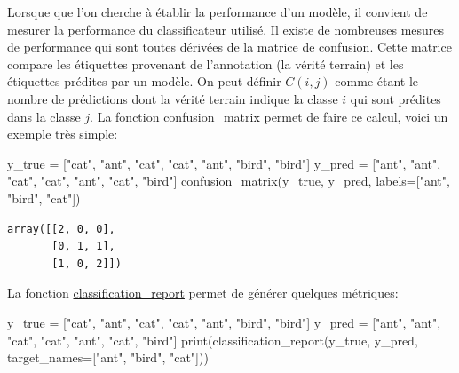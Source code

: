 \documentclass[
  french,
  11pt,
  letterpaper,
  open=any,
  twoside=false,
  french]{scrbook}
\newenvironment{Shaded}{\begin{snugshade}}{\end{snugshade}}
\newcommand{\BuiltInTok}[1]{\textcolor[rgb]{0.00,0.23,0.31}{#1}}
\newcommand{\NormalTok}[1]{\textcolor[rgb]{0.00,0.23,0.31}{#1}}
\newcommand{\OperatorTok}[1]{\textcolor[rgb]{0.37,0.37,0.37}{#1}}
\newcommand{\StringTok}[1]{\textcolor[rgb]{0.13,0.47,0.30}{#1}}
\begin{document}
Lorsque que l'on cherche à établir la performance d'un modèle, il
convient de mesurer la performance du classificateur utilisé. Il existe
de nombreuses mesures de performance qui sont toutes dérivées de la
matrice de confusion. Cette matrice compare les étiquettes provenant de
l'annotation (la vérité terrain) et les étiquettes prédites par un
modèle. On peut définir \(C(i,j)\) comme étant le nombre de prédictions
dont la vérité terrain indique la classe \(i\) qui sont prédites dans la
classe \(j\). La fonction
\href{https://scikit-learn.org/stable/modules/generated/sklearn.metrics.confusion_matrix.html}{confusion\_matrix}
permet de faire ce calcul, voici un exemple très simple:

\begin{Shaded}
\begin{Highlighting}[]
\NormalTok{y\_true }\OperatorTok{=}\NormalTok{ [}\StringTok{"cat"}\NormalTok{, }\StringTok{"ant"}\NormalTok{, }\StringTok{"cat"}\NormalTok{, }\StringTok{"cat"}\NormalTok{, }\StringTok{"ant"}\NormalTok{, }\StringTok{"bird"}\NormalTok{, }\StringTok{"bird"}\NormalTok{]}
\NormalTok{y\_pred }\OperatorTok{=}\NormalTok{ [}\StringTok{"ant"}\NormalTok{, }\StringTok{"ant"}\NormalTok{, }\StringTok{"cat"}\NormalTok{, }\StringTok{"cat"}\NormalTok{, }\StringTok{"ant"}\NormalTok{, }\StringTok{"cat"}\NormalTok{, }\StringTok{"bird"}\NormalTok{]}
\NormalTok{confusion\_matrix(y\_true, y\_pred, labels}\OperatorTok{=}\NormalTok{[}\StringTok{"ant"}\NormalTok{, }\StringTok{"bird"}\NormalTok{, }\StringTok{"cat"}\NormalTok{])}
\end{Highlighting}
\end{Shaded}

\begin{verbatim}
array([[2, 0, 0],
       [0, 1, 1],
       [1, 0, 2]])
\end{verbatim}

La fonction
\href{https://scikit-learn.org/stable/modules/generated/sklearn.metrics.classification_report.html\#sklearn.metrics.classification_report}{classification\_report}
permet de générer quelques métriques:

\begin{Shaded}
\begin{Highlighting}[]
\NormalTok{y\_true }\OperatorTok{=}\NormalTok{ [}\StringTok{"cat"}\NormalTok{, }\StringTok{"ant"}\NormalTok{, }\StringTok{"cat"}\NormalTok{, }\StringTok{"cat"}\NormalTok{, }\StringTok{"ant"}\NormalTok{, }\StringTok{"bird"}\NormalTok{, }\StringTok{"bird"}\NormalTok{]}
\NormalTok{y\_pred }\OperatorTok{=}\NormalTok{ [}\StringTok{"ant"}\NormalTok{, }\StringTok{"ant"}\NormalTok{, }\StringTok{"cat"}\NormalTok{, }\StringTok{"cat"}\NormalTok{, }\StringTok{"ant"}\NormalTok{, }\StringTok{"cat"}\NormalTok{, }\StringTok{"bird"}\NormalTok{]}
\BuiltInTok{print}\NormalTok{(classification\_report(y\_true, y\_pred, target\_names}\OperatorTok{=}\NormalTok{[}\StringTok{"ant"}\NormalTok{, }\StringTok{"bird"}\NormalTok{, }\StringTok{"cat"}\NormalTok{]))}
\end{Highlighting}
\end{Shaded}
\end{document}
